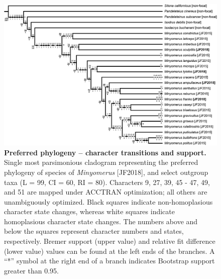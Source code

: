 \documentclass[fleqn,10pt,lineno]{wlpeerj} %
\begin{document}
\begin{figure}[h]
	\centering
	\begin{sideways}
		\includegraphics[height=0.85\textwidth]{figure30.png}
	\end{sideways}
	\caption{\textbf{Preferred phylogeny -- character transitions and support.} Single most parsimonious cladogram representing the preferred phylogeny of species of \textit{Minyomerus} [JF2018], and select outgroup taxa (L = 99, CI = 60, RI = 80). Characters 9, 27, 39, 45 - 47, 49, and 51 are mapped under ACCTRAN optimization; all others are unambiguously optimized. Black squares indicate non-homoplasious character state changes, whereas white squares indicate homoplasious character state changes. The numbers above and below the squares represent character numbers and states, respectively. Bremer support (upper value) and relative fit difference (lower value) values can be found at the left ends of the branches. A ``*'' symbol at the right end of a branch indicates Bootstrap support greater than 0.95.}
	\label{fig:tree1}
\end{figure}
\end{document}
